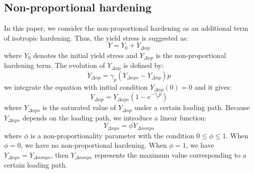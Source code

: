 \subsection{Non-proportional hardening}
In this paper, we consider the non-proportional hardening as an additional term of isotropic hardening.
Thus, the yield stress is suggested as:
\begin{equation}
Y = {Y_0} + {Y_{\Delta np}}
\end{equation}
where $Y_0$ denotes the initial yield stress and ${Y_{\Delta np}}$ is the non-proportional hardening term.
The evolution of ${Y_{\Delta np}}$ is defined by:
\begin{equation}
{\dot Y_{\Delta np}} = {\gamma _p}\left( {{Y_{\Delta nps}} - {Y_{\Delta np}}} \right)\dot p
\end{equation}
we integrate the equation with initial condition ${Y_{\Delta np}}(0)=0$ and it gives:
\begin{equation}
{Y_{\Delta np}} = Y_{\Delta nps}\left( 1-e^{- \gamma_p p} \right)
\end{equation}
where $Y_{\Delta nps}$ is the saturated value of ${Y_{\Delta np}}$ under a certain loading path.
Because ${Y_{\Delta nps}}$ depends on the loading path, we introduce a linear function:
\begin{equation}
{Y_{\Delta nps}} = \phi {Y_{\Delta nonps}}
\end{equation}
where $\phi$ is a non-proportionality parameter with the condition $0 \leq \phi \leq 1$.
When $\phi = 0$, we have no non-proportional hardening.
When $\phi = 1$, we have ${Y_{\Delta nps}} = {Y_{\Delta nonps}}$, then ${Y_{\Delta nonps}}$ represents the maximum value corresponding to a certain loading path.


